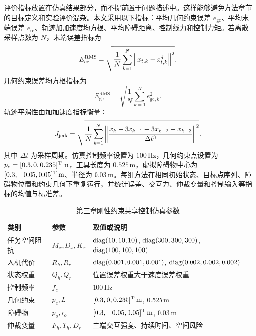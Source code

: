 评价指标放置在仿真结果部分，而不提前置于问题描述中。这样能够避免方法章节的目标定义和实验评价混杂。本文采用以下指标：平均几何约束误差 $\bar e_{\mathrm{gc}}$、平均末端误差 $\bar e_{\mathrm{ee}}$、轨迹加加速度均方根、平均障碍距离、控制线力和控制力矩。若离散采样点数为 $N$，末端误差指标为
\begin{equation}
  E_{\mathrm{ee}}^{\mathrm{RMS}}=\sqrt{\frac{1}{N}\sum_{k=1}^{N}\left\lVert x_{t,k}-x_{t,k}^{d}\right\rVert^2} .
  \label{eq:ch3_ee_metric}
\end{equation}
几何约束误差均方根指标为
\begin{equation}
  E_{\mathrm{gc}}^{\mathrm{RMS}}=\sqrt{\frac{1}{N}\sum_{k=1}^{N}e_{\mathrm{gc},k}^2} .
  \label{eq:ch3_gc_metric}
\end{equation}
轨迹平滑性由加加速度指标衡量：
\begin{equation}
  J_{\mathrm{jerk}}=\sqrt{\frac{1}{N}\sum_{k=1}^{N}\left\lVert \frac{x_{k}-3x_{k-1}+3x_{k-2}-x_{k-3}}{\Delta t^3}\right\rVert^2} .
  \label{eq:ch3_jerk_metric}
\end{equation}
其中 $\Delta t$ 为采样周期。仿真控制频率设置为 $100\,\mathrm{Hz}$，几何约束点设置为 $p_c=[0.3,0,0.235]^{\mathrm{T}}\,\mathrm{m}$，工具长度为 $0.525\,\mathrm{m}$，虚拟障碍物中心为 $[0.3,-0.05,0.05]^{\mathrm{T}}\,\mathrm{m}$、半径为 $0.03\,\mathrm{m}$。每组方法在相同初始状态、目标点序列、障碍物位置和约束几何下重复运行，并统计误差、交互力、仲裁变量和控制输入等指标的均值与标准差。

\begin{table}[H]
\centering
\caption{第三章刚性约束共享控制仿真参数}
\label{tab:ch3_sim_params}
\begin{tabular}{lll}
\toprule
类别 & 参数 & 取值或说明 \\
\midrule
任务空间阻抗 & $M_x,D_x,K_x$ & $\operatorname{diag}(10,10,10)$, $\operatorname{diag}(300,300,300)$, $\operatorname{diag}(100,100,100)$ \\
人机代价 & $R_h,R_r$ & $\operatorname{diag}(0.001,0.001,0.001)$, $\operatorname{diag}(0.002,0.002,0.002)$ \\
状态权重 & $Q_h,Q_r$ & 位置误差权重大于速度误差权重 \\
控制频率 & $f_c$ & $100\,\mathrm{Hz}$ \\
几何约束 & $p_c,L$ & $[0.3,0,0.235]^{\mathrm{T}}\,\mathrm{m}$, $0.525\,\mathrm{m}$ \\
障碍物 & $p_o,r_o$ & $[0.3,-0.05,0.05]^{\mathrm{T}}\,\mathrm{m}$, $0.03\,\mathrm{m}$ \\
仲裁变量 & $F_h,T_h,D_r$ & 主端交互强度、持续时间、空间风险 \\
\bottomrule
\end{tabular}
\end{table}

